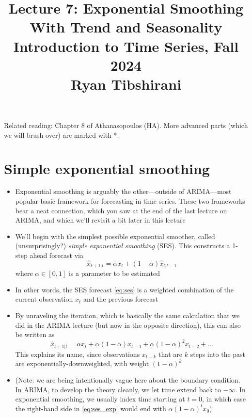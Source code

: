 \documentclass{article}
\title{Lecture 7: Exponential Smoothing With Trend and Seasonality \\ \smallskip
\large Introduction to Time Series, Fall 2024 \\ \smallskip
Ryan Tibshirani}
\date{}
\begin{document}
\maketitle
\RaggedRight
\vspace{-50pt}

Related reading: Chapter 8 of Athanasopoulos (HA). More advanced parts (which we
will brush over) are marked with *.   

\section{Simple exponential smoothing}

\begin{itemize}
\item Exponential smoothing is arguably the other---outside of ARIMA---most 
  popular basic framework for forecasting in time series. These two frameworks
  bear a neat connection, which you saw at the end of the last lecture on ARIMA,
  and which we'll revisit a bit later in this lecture

\item We'll begin with the simplest possible exponential smoother, called
  (unsurprisingly?) \emph{simple exponential smoothing} (SES). This constructs 
  a 1-step ahead forecast via
  \begin{equation}
  \label{eq:ses}
  \hat{x}_{t+1 | t }= \alpha x_t + (1-\alpha) \hat{x}_{t | t-1}
  \end{equation}
  where $\alpha \in [0,1]$ is a parameter to be estimated

\item In other words, the SES forecast \eqref{eq:ses} is a weighted combination 
  of the current observation $x_t$ and the previous forecast  

\item By unraveling the iteration, which is basically the same calculation that
  we did in the ARIMA lecture (but now in the opposite direction), this can also
  be written as    
  \begin{equation}
  \label{eq:ses_exp}
  \hat{x}_{t+1 | t} = \alpha x_t + \alpha (1-\alpha) x_{t-1} + \alpha
  (1-\alpha)^2 x_{t-2} + \dots
  \end{equation}
  This explains its name, since observations $x_{t-k}$ that are $k$ steps into 
  the past are exponentially-downweighted, with weight $(1-\alpha)^k$  

\item  (Note: we are being intentionally vague here about the boundary 
  condition. In ARIMA, to develop the theory cleanly, we let time extend back to
  $-\infty$. In  exponential smoothing, we usually index time starting at $t =
  0$, in which case the right-hand side in \eqref{eq:ses_exp} would end with
  $\alpha (1-\alpha)^t x_0$) 


\end{itemize}
\end{document}
